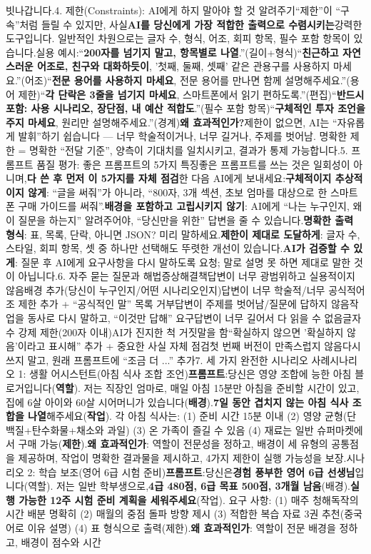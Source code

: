 빗나갑니다.4. 제한(Constraints): AI에게 하지 말아야 할 것 알려주기“제한”이 “구속”처럼 들릴 수 있지만, 사실\textbf{AI를 당신에게 가장 적합한 출력으로 수렴시키는}강력한 도구입니다. 일반적인 차원으로는 글자 수, 형식, 어조, 회피 항목, 필수 포함 항목이 있습니다.실용 예시:“\textbf{200자를 넘기지 말고, 항목별로 나열}.”(길이+형식)“\textbf{친근하고 자연스러운 어조로, 친구와 대화하듯이}, '첫째, 둘째, 셋째' 같은 관용구를 사용하지 마세요.”(어조)“\textbf{전문 용어를 사용하지 마세요}, 전문 용어를 만나면 함께 설명해주세요.”(용어 제한)“\textbf{각 단락은 3줄을 넘기지 마세요}, 스마트폰에서 읽기 편하도록.”(편집)“\textbf{반드시 포함: 사용 시나리오, 장단점, 내 예산 적합도}.”(필수 포함 항목)“\textbf{구체적인 투자 조언을 주지 마세요}, 원리만 설명해주세요.”(경계)\textbf{왜 효과적인가?}제한이 없으면, AI는 “자유롭게 발휘”하기 쉽습니다 — 너무 학술적이거나, 너무 길거나, 주제를 벗어남. 명확한 제한 = 명확한 “전달 기준”, 양측이 기대치를 일치시키고, 결과가 통제 가능합니다.5. 프롬프트 품질 평가: 좋은 프롬프트의 5가지 특징좋은 프롬프트를 쓰는 것은 일회성이 아니며,\textbf{다 쓴 후 먼저 이 5가지를 자체 점검}한 다음 AI에게 보내세요:\textbf{구체적이지 추상적이지 않게}: “글을 써줘”가 아니라, “800자, 3개 섹션, 초보 엄마를 대상으로 한 스마트폰 구매 가이드를 써줘”.\textbf{배경을 포함하고 고립시키지 않기}: AI에게 “나는 누구인지, 왜 이 질문을 하는지” 알려주어야, “당신만을 위한” 답변을 줄 수 있습니다.\textbf{명확한 출력 형식}: 표, 목록, 단락, 아니면 JSON? 미리 말하세요.\textbf{제한이 제대로 도달하게}: 글자 수, 스타일, 회피 항목, 셋 중 하나만 선택해도 뚜렷한 개선이 있습니다.\textbf{AI가 검증할 수 있게}: 질문 후 AI에게 요구사항을 다시 말하도록 요청; 말로 설명 못 하면 제대로 말한 것이 아닙니다.6. 자주 묻는 질문과 해법증상해결책답변이 너무 광범위하고 실용적이지 않음배경 추가(당신이 누구인지/어떤 시나리오인지)답변이 너무 학술적/너무 공식적어조 제한 추가 + “공식적인 말” 목록 거부답변이 주제를 벗어남/질문에 답하지 않음작업을 동사로 다시 말하고, “이것만 답해” 요구답변이 너무 길어서 다 읽을 수 없음글자 수 강제 제한(200자 이내)AI가 진지한 척 거짓말을 함“확실하지 않으면 '확실하지 않음'이라고 표시해” 추가 + 중요한 사실 자체 점검첫 번째 버전이 만족스럽지 않음다시 쓰지 말고, 원래 프롬프트에 “조금 더 ...” 추가7. 세 가지 완전한 시나리오 사례시나리오 1: 생활 어시스턴트(아침 식사 조합 조언)\textbf{프롬프트}:당신은 영양 조합에 능한 아침 블로거입니다(\textbf{역할}). 저는 직장인 엄마로, 매일 아침 15분만 아침을 준비할 시간이 있고, 집에 6살 아이와 60살 시어머니가 있습니다(\textbf{배경}).\textbf{7일 동안 겹치지 않는 아침 식사 조합을 나열}해주세요(\textbf{작업}). 각 아침 식사는: (1) 준비 시간 15분 이내 (2) 영양 균형(단백질+탄수화물+채소와 과일) (3) 온 가족이 즐길 수 있음 (4) 재료는 일반 슈퍼마켓에서 구매 가능(\textbf{제한}).\textbf{왜 효과적인가}: 역할이 전문성을 정하고, 배경이 세 유형의 공통점을 제공하며, 작업이 명확한 결과물을 제시하고, 4가지 제한이 실행 가능성을 보장.시나리오 2: 학습 보조(영어 6급 시험 준비)\textbf{프롬프트}:당신은\textbf{경험 풍부한 영어 6급 선생님}입니다(역할). 저는 일반 학부생으로,\textbf{4급 480점, 6급 목표 500점, 3개월 남음}(배경).\textbf{실행 가능한 12주 시험 준비 계획을 세워주세요}(작업). 요구 사항: (1) 매주 청해독작의 시간 배분 명확히 (2) 매월의 중점 돌파 방향 제시 (3) 적합한 복습 자료 3권 추천(중국어로 이유 설명) (4) 표 형식으로 출력(제한).\textbf{왜 효과적인가}: 역할이 전문 배경을 정하고, 배경이 점수와 시간 